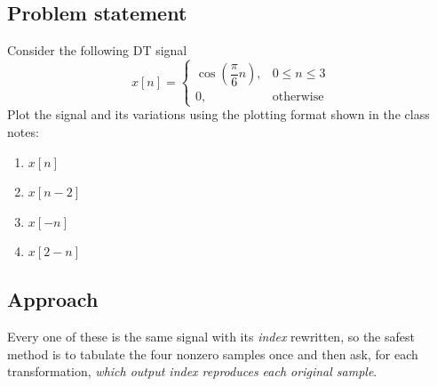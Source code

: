 





\subsection*{Problem statement}

Consider the following DT signal
\begin{equation}
  x[n] =
  \begin{cases}
    \cos\!\left(\dfrac{\pi}{6}n\right), & 0 \le n \le 3 \\[8pt]
    0, & \text{otherwise}
  \end{cases}
  \label{eq:xn}
\end{equation}
Plot the signal and its variations using the plotting format shown in the class
notes:
\begin{enumerate}
  \item $x[n]$
  \item $x[n-2]$
  \item $x[-n]$ 
  \item $x[2-n]$
\end{enumerate}

\subsection*{Approach}

Every one of these is the same signal with its \emph{index} rewritten, so the
safest method is to tabulate the four nonzero samples once and then ask, for
each transformation, \emph{which output index reproduces each original sample}.

